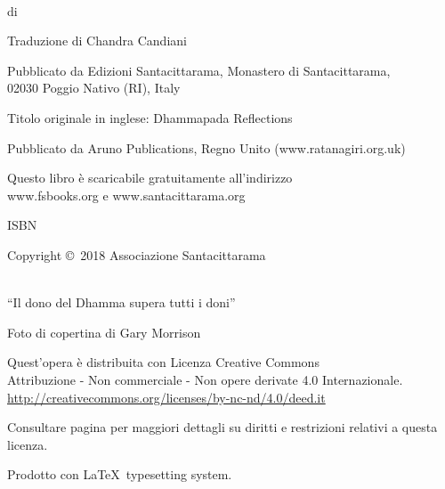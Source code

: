 \cleartoverso
\thispagestyle{empty}
\enlargethispage{\baselineskip}

{\copyrightsize\setlength{\parskip}{0.5\baselineskip}\setlength{\parindent}{0em}%
\raggedright%
\shaker\color[gray]{0.3}

\thetitle\\
di \theauthor

Traduzione di Chandra Candiani

Pubblicato da Edizioni Santacittarama, Monastero di Santacittarama,\\
02030 Poggio Nativo (RI), Italy

Titolo originale in inglese: Dhammapada Reflections

Pubblicato da Aruno Publications, Regno Unito (www.ratanagiri.org.uk)

Questo libro è scaricabile gratuitamente all'indirizzo\\
www.fsbooks.org e www.santacittarama.org

ISBN \theISBN

Copyright \copyright\ 2018 Associazione Santacittarama

\\
``Il dono del Dhamma supera tutti i doni''

Foto di copertina di Gary Morrison

{\tiny
Quest'opera è distribuita con Licenza Creative Commons\\
Attribuzione - Non commerciale - Non opere derivate 4.0 Internazionale.\\
\href{http://creativecommons.org/licenses/by-nc-nd/4.0/deed.it}{http://creativecommons.org/licenses/by-nc-nd/4.0/deed.it}

Consultare pagina \pageref{copyright-details} per maggiori dettagli su diritti e restrizioni relativi a questa licenza.

Prodotto con \LaTeX\ typesetting system.

\theEditionInfo

}}

